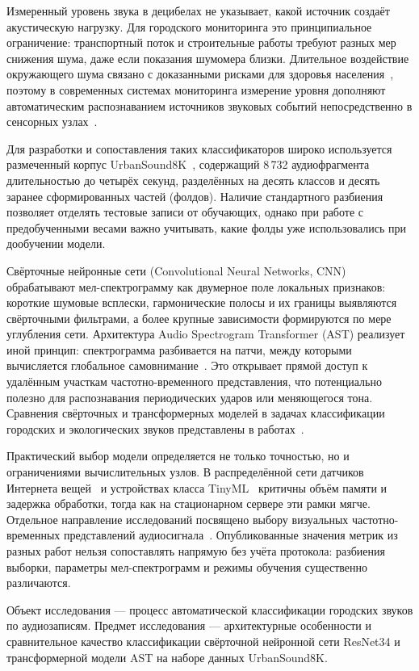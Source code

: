 \documentclass[pdflatex,sn-mathphys-num]{sn-jnl}
\begin{document}
Измеренный уровень звука в децибелах не указывает, какой источник создаёт акустическую нагрузку. Для городского мониторинга это принципиальное ограничение: транспортный поток и строительные работы требуют разных мер снижения шума, даже если показания шумомера близки. Длительное воздействие окружающего шума связано с доказанными рисками для здоровья населения~\cite{ref1}, поэтому в современных системах мониторинга измерение уровня дополняют автоматическим распознаванием источников звуковых событий непосредственно в сенсорных узлах~\cite{ref2}.

Для разработки и сопоставления таких классификаторов широко используется размеченный корпус UrbanSound8K~\cite{ref3,ref4}, содержащий 8\,732 аудиофрагмента длительностью до четырёх секунд, разделённых на десять классов и десять заранее сформированных частей (фолдов). Наличие стандартного разбиения позволяет отделять тестовые записи от обучающих, однако при работе с предобученными весами важно учитывать, какие фолды уже использовались при дообучении модели.

Свёрточные нейронные сети (Convolutional Neural Networks, CNN) обрабатывают мел-спектрограмму как двумерное поле локальных признаков: короткие шумовые всплески, гармонические полосы и их границы выявляются свёрточными фильтрами, а более крупные зависимости формируются по мере углубления сети. Архитектура Audio Spectrogram Transformer (AST) реализует иной принцип: спектрограмма разбивается на патчи, между которыми вычисляется глобальное самовнимание~\cite{ref5}. Это открывает прямой доступ к удалённым участкам частотно-временного представления, что потенциально полезно для распознавания периодических ударов или меняющегося тона. Сравнения свёрточных и трансформерных моделей в задачах классификации городских и экологических звуков представлены в работах~\cite{ref6,ref7,ref8,ref12,ref13}.

Практический выбор модели определяется не только точностью, но и ограничениями вычислительных узлов. В распределённой сети датчиков Интернета вещей~\cite{ref9} и устройствах класса TinyML~\cite{ref10} критичны объём памяти и задержка обработки, тогда как на стационарном сервере эти рамки мягче. Отдельное направление исследований посвящено выбору визуальных частотно-временных представлений аудиосигнала~\cite{ref11}. Опубликованные значения метрик из разных работ нельзя сопоставлять напрямую без учёта протокола: разбиения выборки, параметры мел-спектрограмм и режимы обучения существенно различаются.

Объект исследования --- процесс автоматической классификации городских звуков по аудиозаписям. Предмет исследования --- архитектурные особенности и сравнительное качество классификации свёрточной нейронной сети ResNet34 и трансформерной модели AST на наборе данных UrbanSound8K.
\end{document}
